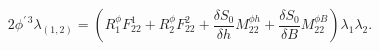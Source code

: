 \begin{equation}
2\phi ^{\prime \,3}\lambda _{(1,2)}=\left( R_{1}^{\phi
}F_{22}^{1}+R_{2}^{\phi }F_{22}^{2}+\frac{\delta S_{0}}{\delta h}%
M_{22}^{\phi h}+\frac{\delta S_{0}}{\delta B}M_{22}^{\phi B}\right) \lambda
_{1}\lambda _{2}.  \label{ansatz}
\end{equation}

